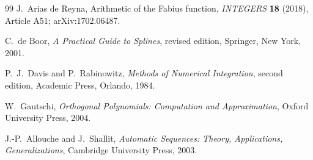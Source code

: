 \documentclass[11pt]{article}
\theoremstyle{definition}
\theoremstyle{remark}
\begin{document}
\begin{thebibliography}{99}
J.~Arias de Reyna,
\newblock Arithmetic of the Fabius function,
\newblock \emph{INTEGERS} \textbf{18} (2018), Article A51;
arXiv:1702.06487.

C.~de Boor,
\newblock \emph{A Practical Guide to Splines}, revised edition,
\newblock Springer, New York, 2001.

P.~J.~Davis and P.~Rabinowitz,
\newblock \emph{Methods of Numerical Integration}, second edition,
\newblock Academic Press, Orlando, 1984.

W.~Gautschi,
\newblock \emph{Orthogonal Polynomials: Computation and Approximation},
\newblock Oxford University Press, 2004.

J.-P.~Allouche and J.~Shallit,
\newblock \emph{Automatic Sequences: Theory, Applications, Generalizations},
\newblock Cambridge University Press, 2003.

\end{thebibliography}
\end{document}
